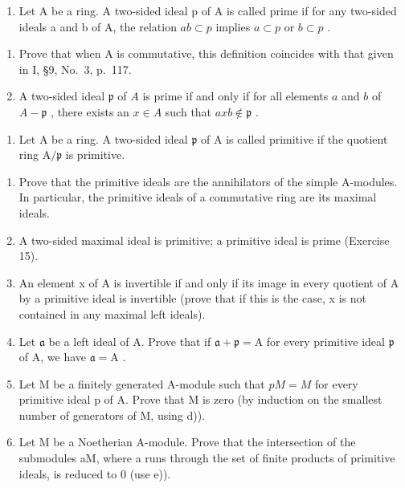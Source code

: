 \begin{enumerate}
\def\labelenumi{\arabic{enumi})}
\setcounter{enumi}{14}
\tightlist
\item
  Let A be a ring. A two-sided ideal p of A is called prime if for any two-sided ideals a and b of A, the relation \(ab \subset p\) implies \(a \subset p\) or \(b \subset p\) .
\end{enumerate}

\begin{enumerate}
\def\labelenumi{\alph{enumi})}
\item
  Prove that when A is commutative, this definition coincides with that given in I, §9, No.~3, p.~117.
\item
  A two-sided ideal \(\mathfrak{p}\) of \(A\) is prime if and only if for all elements \(a\) and \(b\) of \(A - \mathfrak{p}\) , there exists an \(x \in A\) such that \(axb \notin \mathfrak{p}\) .
\end{enumerate}

\begin{enumerate}
\def\labelenumi{\arabic{enumi})}
\setcounter{enumi}{15}
\tightlist
\item
  Let \(\mathrm{A}\) be a ring. A two-sided ideal \(\mathfrak{p}\) of \(\mathrm{A}\) is called primitive if the quotient ring \(\mathrm{A} / \mathfrak{p}\) is primitive.
\end{enumerate}

\begin{enumerate}
\def\labelenumi{\alph{enumi})}
\item
  Prove that the primitive ideals are the annihilators of the simple A-modules. In particular, the primitive ideals of a commutative ring are its maximal ideals.
\item
  A two-sided maximal ideal is primitive; a primitive ideal is prime (Exercise 15).
\item
  An element x of A is invertible if and only if its image in every quotient of A by a primitive ideal is invertible (prove that if this is the case, x is not contained in any maximal left ideals).
\item
  Let \(\mathfrak{a}\) be a left ideal of A. Prove that if \(\mathfrak{a} + \mathfrak{p} = \mathrm{A}\) for every primitive ideal \(\mathfrak{p}\) of A, we have \(\mathfrak{a} = \mathrm{A}\) .
\item
  Let M be a finitely generated A-module such that \(pM = M\) for every primitive ideal p of A. Prove that M is zero (by induction on the smallest number of generators of M, using d)).
\item
  Let M be a Noetherian A-module. Prove that the intersection of the submodules aM, where a runs through the set of finite products of primitive ideals, is reduced to 0 (use e)).
\end{enumerate}

